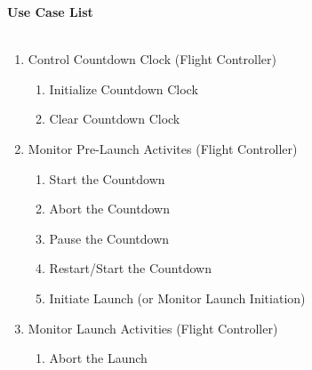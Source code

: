 \documentclass[letterpaper]{article}
\begin{document}
\noindent
\textbf{Use Case List}\\\\
\begin{enumerate}
\item Control Countdown Clock (Flight Controller)
\begin{enumerate}
\item Initialize Countdown Clock
\item Clear Countdown Clock
\end{enumerate}
\item Monitor Pre-Launch Activites (Flight Controller)
\begin{enumerate}
\item Start the Countdown
\item Abort the Countdown
\item Pause the Countdown
\item Restart/Start the Countdown
\item Initiate Launch (or Monitor Launch Initiation)
\end{enumerate}
\item Monitor Launch Activities (Flight Controller)
\begin{enumerate}
\item Abort the Launch
\end{enumerate}
\end{enumerate}
\end{document}
